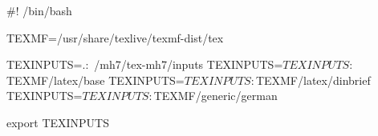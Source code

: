 #! /bin/bash

TEXMF=/usr/share/texlive/texmf-dist/tex

TEXINPUTS=.:~/mh7/tex-mh7/inputs
TEXINPUTS=$TEXINPUTS:$TEXMF/latex/base
TEXINPUTS=$TEXINPUTS:$TEXMF/latex/dinbrief
TEXINPUTS=$TEXINPUTS:$TEXMF/generic/german

export TEXINPUTS
